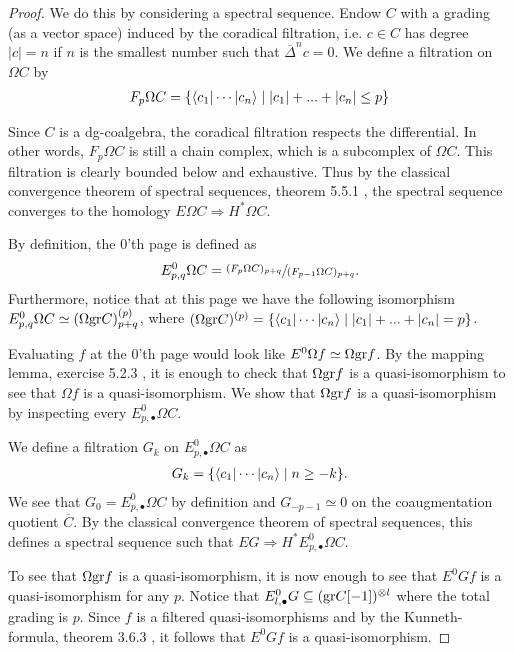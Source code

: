 \documentclass[../thesis.tex]{subfiles}
\begin{document}
            \begin{proof}
                We do this by considering a spectral sequence. Endow $C$ with a grading (as a vector space) induced by the coradical filtration, i.e. $c\in C$ has degree $|c|=n$ if $n$ is the smallest number such that $\overline{\Delta}^nc = 0$. We define a filtration on $\Omega C$ by
                \begin{align*}
                    F_p\Omega C = \startset{\langle c_1 | \cdots | c_n \rangle \mid |c_1|+...+|c_n|\leq p}
                \end{align*}

                Since $C$ is a dg-coalgebra, the coradical filtration respects the differential. In other words, $F_p\Omega C$ is still a chain complex, which is a subcomplex of $\Omega C$. This filtration is clearly bounded below and exhaustive. Thus by the classical convergence theorem of spectral sequences, theorem 5.5.1 \cite{Weibel94}, the spectral sequence converges to the homology $E\Omega C \Rightarrow H^*\Omega C$.

                By definition, the $0$'th page is defined as 
                \begin{align*}
                    E^0_{p,q}\Omega C = \sfrac{(F_p\Omega C)_{p+q}}{(F_{p-1}\Omega C)_{p+q}}\tt{.}
                \end{align*}
                Furthermore, notice that at this page we have the following isomorphism $E^0_{p,q}\Omega C \simeq (\Omega \tt{gr}C)^{(p)}_{p+q}$, where $(\Omega \tt{gr}C)^{(p)} = \startset{\langle c_1 | \cdots | c_n \rangle \mid |c_1|+...+|c_n| = p}$.

                Evaluating $f$ at the $0$'th page would look like $E^0\Omega f \simeq \Omega \tt{gr}f$. By the mapping lemma, exercise 5.2.3 \cite{Weibel94}, it is enough to check that $\Omega \tt{gr}f$ is a quasi-isomorphism to see that $\Omega f$ is a quasi-isomorphism. We show that $\Omega \tt{gr}f$ is a quasi-isomorphism by inspecting every $E^0_{p,\bullet}\Omega C$.

                We define a filtration $G_k$ on $E^0_{p,\bullet}\Omega C$ as
                \begin{align*}
                    G_k = \startset{\langle c_1 | \cdots | c_n \rangle \mid n \geq -k}.
                \end{align*}
                We see that $G_0 = E^0_{p, \bullet}\Omega C$ by definition and $G_{-p-1} \simeq 0$ on the coaugmentation quotient $\overline{C}$. By the classical convergence theorem of spectral sequences, this defines a spectral sequence such that $EG \Rightarrow H^*E^0_{p, \bullet}\Omega C$.

                To see that $\Omega \tt{gr}f$ is a quasi-isomorphism, it is now enough to see that $E^0Gf$ is a quasi-isomorphism for any $p$. Notice that $E^0_{l,\bullet}G \subseteq (\tt{gr}C[-1])^{\otimes l}$ where the total grading is $p$. Since $f$ is a filtered quasi-isomorphisms and by the Kunneth-formula, theorem 3.6.3 \cite{Weibel94}, it follows that $E^0Gf$ is a quasi-isomorphism.
            \end{proof}
\end{document}
